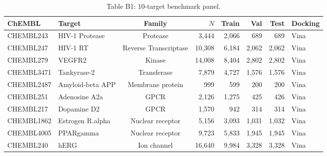 \begin{table}[ht]
\caption{Table B1: 10-target benchmark panel.}
\label{tab:benchmark_panel}
\centering\small
\begin{tabular}{llcrrrrl}
\toprule
ChEMBL & Target & Family & $N$ & Train & Val & Test & Docking \\
\midrule
CHEMBL243 & HIV-1 Protease & Protease & 3,444 & 2,066 & 689 & 689 & Vina \\
CHEMBL247 & HIV-1 RT & Reverse Transcriptase & 10,308 & 6,184 & 2,062 & 2,062 & Vina \\
CHEMBL279 & VEGFR2 & Kinase & 14,008 & 8,404 & 2,802 & 2,802 & Vina \\
CHEMBL3471 & Tankyrase-2 & Transferase & 7,879 & 4,727 & 1,576 & 1,576 & Vina \\
CHEMBL2487 & Amyloid-beta APP & Membrane protein & 999 & 599 & 200 & 200 & Vina \\
CHEMBL251 & Adenosine A2a & GPCR & 2,126 & 1,275 & 425 & 426 & Vina \\
CHEMBL217 & Dopamine D2 & GPCR & 1,570 & 942 & 314 & 314 & Vina \\
CHEMBL1862 & Estrogen R.alpha & Nuclear receptor & 5,156 & 3,093 & 1,031 & 1,032 & Vina \\
CHEMBL4005 & PPARgamma & Nuclear receptor & 9,723 & 5,833 & 1,945 & 1,945 & Vina \\
CHEMBL240 & hERG & Ion channel & 16,640 & 9,984 & 3,328 & 3,328 & Vina \\
\bottomrule
\end{tabular}
\end{table}
